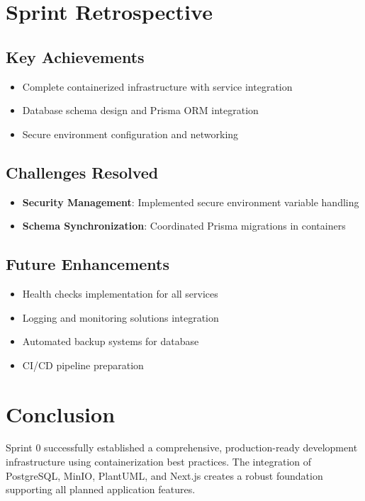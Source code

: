 \section{Sprint Retrospective}

\subsection{Key Achievements}
\begin{itemize}
    \item  Complete containerized infrastructure with service integration
    \item  Database schema design and Prisma ORM integration
    \item  Secure environment configuration and networking
\end{itemize}

\subsection{Challenges Resolved}
\begin{itemize}
    \item \textbf{Security Management}: Implemented secure environment variable handling
    \item \textbf{Schema Synchronization}: Coordinated Prisma migrations in containers
\end{itemize}

\subsection{Future Enhancements}
\begin{itemize}
    \item Health checks implementation for all services
    \item Logging and monitoring solutions integration
    \item Automated backup systems for database
    \item CI/CD pipeline preparation
\end{itemize}

\section{Conclusion}

Sprint 0 successfully established a comprehensive, production-ready development infrastructure using containerization best practices. The integration of PostgreSQL, MinIO, PlantUML, and Next.js creates a robust foundation supporting all planned application features.
